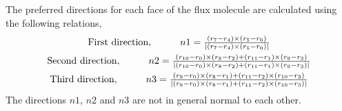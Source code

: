      The preferred directions for each face of the flux molecule are calculated using the following relations,
     \begin{equation}
     \label{eq:pdeq}
         \begin{gathered}
         $First direction$,\hspace{1cm} n1=\frac{(r_7-r_4)\times(r_5-r_6)}{|(r_7-r_4)\times(r_5-r_6)|}\\
         $Second direction$,\hspace{1cm} n2=\frac{(r_{10}-r_0)\times(r_8-r_2)+(r_{11}-r_1)\times(r_9-r_3)}{|(r_{10}-r_0)\times(r_8-r_2)+(r_{11}-r_1)\times(r_9-r_3)|}\\
         $Third direction$,\hspace{1cm} n3=\frac{(r_9-r_0)\times(r_8-r_1)+(r_{11}-r_2)\times(r_{10}-r_3)}{|(r_9-r_0)\times(r_8-r_1)+(r_{11}-r_2)\times(r_{10}-r_3)|}
         \end{gathered}
     \end{equation}
The directions $n1$, $n2$ and $n3$ are not in general normal to each other.

